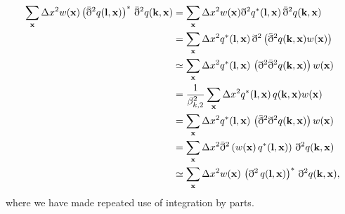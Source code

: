 \documentclass[a4paper,11pt]{article}
\newcommand{\summ}[1]{\sum_{\bf #1}\Delta #1^2}
\begin{document}
      \begin{align}\nonumber
        \summ{x}w({\bf x})\left(\bar{\eth}^2q({\bf l},{\bf x})\right)^*\,\bar{\eth}^2q({\bf k},{\bf x})
        &=\summ{x}w({\bf x})\eth^2 q^*({\bf l},{\bf x})\,\bar{\eth}^2q({\bf k},{\bf x})\\\nonumber
        &=\summ{x}q^*({\bf l},{\bf x})\,\eth^2\left(\bar{\eth}^2q({\bf k},{\bf x})w({\bf x})\right)\\\nonumber
        &\simeq\summ{x}q^*({\bf l},{\bf x})\,\left(\eth^2\bar{\eth}^2q({\bf k},{\bf x})\right)w({\bf x})\\
        &=\frac{1}{\beta^2_{k,2}}\summ{x}q^*({\bf l},{\bf x})\,q({\bf k},{\bf x})w({\bf x})\\\nonumber
        &=\summ{x}q^*({\bf l},{\bf x})\,\left(\bar{\eth}^2\eth^2q({\bf k},{\bf x})\right)w({\bf x})\\\nonumber
        &=\summ{x}\bar{\eth}^2\left(w({\bf x})\,q^*({\bf l},{\bf x})\right)\,\eth^2q({\bf k},{\bf x})\\
        &\simeq\summ{x}w({\bf x})\,\left(\eth^2\,q({\bf l},{\bf x})\right)^*\,\eth^2q({\bf k},{\bf x}),
      \end{align}
      where we have made repeated use of integration by parts.
    
\end{document}
